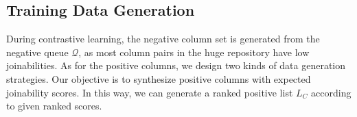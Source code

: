 \subsection{Training Data Generation}
\label{subsec:data_gen}
During contrastive learning, the negative column set is generated from the negative queue $\mathcal{Q}$, as most column pairs in the huge repository have low joinabilities.
As for the positive columns,
we design two kinds of data generation strategies.
Our objective is to synthesize positive columns with expected joinability scores. In this way, we can generate a ranked 
positive list $L_C$ according to given ranked  scores.

 
  
	
 
